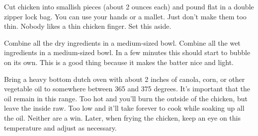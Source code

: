 \begin{IngredientsAndSteps}
    {}

    {}

    \ListIngredientsAndSteps[Then...]
    {
    }
    {
        Cut chicken into smallish pieces (about 2 ounces each) and pound flat in a double zipper lock bag. You can
        use your hands or a mallet. Just don't make them too thin. Nobody likes a thin chicken finger. Set this aside.

        Combine all the dry ingredients in a medium-sized bowl. Combine all the wet ingredients in a medium-sized bowl. In a few minutes this should start to bubble on its own. This
        is a good thing because it makes the batter nice and light.

        Bring a heavy bottom dutch oven with about 2 inches of canola, corn, or other vegetable oil to somewhere between
        365 and 375 degrees. It's important that the oil remain in this range. Too hot and you'll burn the outside of the
        chicken, but leave the inside raw. Too low and it'll take forever to cook while soaking up all the oil. Neither
        are a win. Later, when frying the chicken, keep an eye on this temperature and adjust as necessary.

}
\end{IngredientsAndSteps}
